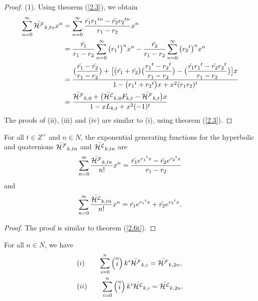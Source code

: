 \begin{proof}(1).
Using theorem (\ref{2.3}), we obtain
\begin{align*}
\sum\limits_{n=0}^{\infty}\bar{{\mathcal{H^F}}}_{k,tn}x^n&= \sum\limits_{n=0}^{\infty}\dfrac{\bar{r_1}{{r_1}}^{tn}-\bar{r_2}{r_{2}}^{tn}}{r_1-r_2}x^n\\
&=\dfrac{\bar{r_1}}{r_1-r_2}\sum\limits_{n=0}^{\infty}\big({r_1}^t\big)^nx^n-\dfrac{\bar{r_2}}{r_1-r_2}\sum\limits_{n=0}^{\infty}\big({r_2}^t\big)^nx^n\\
&=\dfrac{\big(\dfrac{\bar{r_1}-\bar{r_2}}{r_1-r_2}\big)+\big[\big(\bar{r_1}+\bar{r_2}\big)\big(\dfrac{{r_1}^t-{r_2}^t}{r_1-r_2}\big)-\big(\dfrac{\bar{r_1}{r_1}^t-\bar{r_2}{r_2}^t}{r_1-r_2}\big)\big]x}{1-\big({r_1}^t+{r_2}^t\big)x+x^2(r_1r_2)^t}\\
&=\dfrac{\bar{{\mathcal{H^F}}}_{k,0}+\big(\bar{{\mathcal{H^L}}}_{k,0}F_{k,t}-\bar{{\mathcal{H^F}}}_{k,t}\big)x}{1-xL_{k,t}+x^2(-1)^t}
\end{align*}
The proofs of (ii), (iii) and (iv) are similar to (i), using theorem (\ref{2.3}).
\end{proof}
\begin{theorem}
For all $t\in Z^+$ and $n\in N$, the exponential generating functions for the hyperbolic \kF\vspace{.5mm} and \kL\vspace{.5mm} quaternions $\bar{{\mathcal{H^F}}}_{k,tn}$ and $\bar{{\mathcal{H^L}}}_{k,tn}$ are \label{2.6t}
\begin{align*}
\sum\limits_{n=0}^{\infty}\dfrac{\bar{{\mathcal{H^F}}}_{k,tn}}{{n!}}x^n=\dfrac{\bar{r_1}e^{{r_1}^tx}-\bar{r_2}e^{{r_2}^tx}}{r_1-r_2}
\end{align*}
and
\begin{align*}
\sum\limits_{n=0}^{\infty}\dfrac{\bar{{\mathcal{H^L}}}_{k,tn}}{{n!}}x^n={\bar{r_1}e^{{r_1}^tx}+\bar{r_2}e^{{r_2}^tx}}.
\end{align*}
\end{theorem}
\begin{proof}
The proof is similar to theorem (\ref{2.6t}).
\end{proof}
\begin{theorem}
For all $n\in N$, we have\label{2.7t}
\begin{align*}
&(i)\qquad\sum\limits_{i=0}^{n}\left( \stackrel{n}{i}\right) k^{i}\bar{{\mathcal{H^F}}}_{k,i}=\bar{{\mathcal{H^F}}}_{k,2n},\\
&(ii)\qquad\sum\limits_{i=0}^{n}\left( \stackrel{n}{i}\right) k^{i}\bar{{\mathcal{H^L}}}_{k,i}=\bar{{\mathcal{H^L}}}_{k,2n}.
\end{align*}
\end{theorem}
